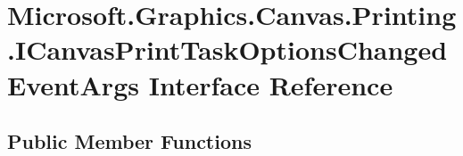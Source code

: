 \hypertarget{interface_microsoft_1_1_graphics_1_1_canvas_1_1_printing_1_1_i_canvas_print_task_options_changed_event_args}{}\section{Microsoft.\+Graphics.\+Canvas.\+Printing.\+I\+Canvas\+Print\+Task\+Options\+Changed\+Event\+Args Interface Reference}
\label{interface_microsoft_1_1_graphics_1_1_canvas_1_1_printing_1_1_i_canvas_print_task_options_changed_event_args}
\subsection*{Public Member Functions}
